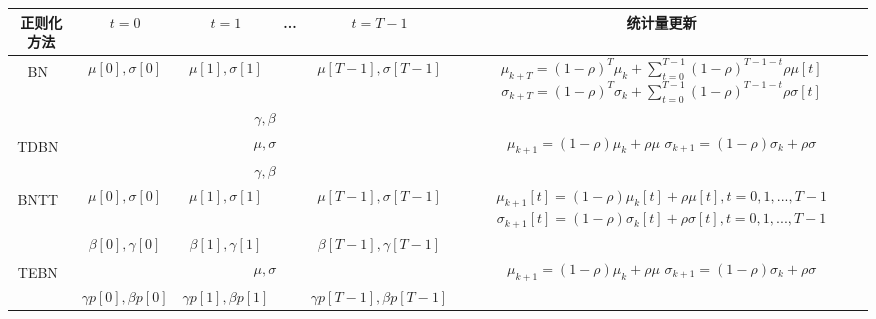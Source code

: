 \documentclass[10.5pt,compsoc,UTF8]{CjC}
\theoremstyle{mystyle}
\newcommand{\upcite}[1]{\textsuperscript{\cite{#1}}}
\begin{document}
\begin{multicols}{1}
\begin{table}[H]
	\vspace {-2.5mm}
	\begin{center}
\begin{tabular}{cccccc}
	\toprule
	\hline
	正则化方法                      & $t=0$        & $t=1$        & ... & $t=T-1$ &  统计量更新     \\ \hline
	\multirow{2}{*}{BN~\upcite{ioffe2015batch}}   & $\mu[0],\sigma[0]$   & $\mu[1],\sigma[1]$   & &$\mu[T-1],\sigma[T-1]$      & \makecell[c]{$\mu_{k+T} = (1-\rho)^{T}\mu_{k} + \sum_{t=0}^{T-1}(1-\rho)^{T-1-t}\rho\mu[t]$\\$\sigma_{k+T} = (1-\rho)^{T}\sigma_{k} + \sum_{t=0}^{T-1}(1-\rho)^{T-1-t}\rho\sigma[t]$}  \\ \cline{2-6} 
	& \multicolumn{4}{c}{$\gamma, \beta$}              \\ \hline
	\multirow{2}{*}{TDBN~\upcite{zheng2020going}} & \multicolumn{4}{c}{$\mu, \sigma$}  & \makecell[c]{$\mu_{k+1} = (1 - \rho)\mu_{k} + \rho\mu$ \\ $\sigma_{k+1} = (1 - \rho)\sigma_{k} + \rho\sigma$ }           \\ \cline{2-6} 
	& \multicolumn{4}{c}{$\gamma, \beta$}             \\ \hline
	\multirow{2}{*}{BNTT~\upcite{10.3389/fnins.2021.773954}} & $\mu[0],\sigma[0]$   & $\mu[1],\sigma[1]$   &     & $\mu[T-1],\sigma[T-1]$ & \makecell[c]{$\mu_{k+1}[t] = (1 - \rho)\mu_{k}[t] + \rho\mu[t], t=0,1,...,T-1$ \\ $\sigma_{k+1}[t] = (1 - \rho)\sigma_{k}[t] + \rho\sigma[t], t=0,1,...,T-1$ }    \\ \cline{2-6} 
	& $\beta[0], \gamma[0]$ & $\beta[1], \gamma[1]$ &     & $\beta[T-1], \gamma[T-1]$ &  \\ \hline
	\multirow{2}{*}{TEBN~\upcite{duan2022temporal}} & \multicolumn{4}{c}{$\mu, \sigma$}  & \makecell[c]{$\mu_{k+1} = (1 - \rho)\mu_{k} + \rho\mu$ \\ $\sigma_{k+1} = (1 - \rho)\sigma_{k} + \rho\sigma$ }              \\ \cline{2-6} 
	& $\gamma p[0], \beta p[0]$ & $\gamma p[1], \beta p[1]$ &     & $\gamma p[T-1], \beta p[T-1]$ & \\ \hline
	\bottomrule
\end{tabular}
		\label{tab: bn methods}
	\end{center}
\end{table}


\end{multicols}
\end{document}
